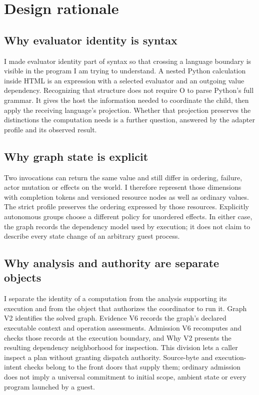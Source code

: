 \documentclass[11pt,oneside]{article}
\begin{document}
\section{Design rationale}
\label{sec:assessment}

\subsection{Why evaluator identity is syntax}

I made evaluator identity part of syntax so that crossing a language boundary
is visible in the program I am trying to understand. A nested Python
calculation inside HTML is an expression with a selected evaluator and an
outgoing value dependency. Recognizing that structure does not require O to
parse Python's full grammar. It gives the host the information needed to
coordinate the child, then apply the receiving language's projection. Whether
that projection preserves the distinctions the computation needs is a further
question, answered by the adapter profile and its observed result.

\subsection{Why graph state is explicit}

Two invocations can return the same value and still differ in ordering,
failure, actor mutation or effects on the world. I therefore represent those
dimensions with completion tokens and versioned resource nodes as well as
ordinary values. The strict profile preserves the ordering expressed by those
resources. Explicitly autonomous groups choose a different policy for
unordered effects. In either case, the graph records the dependency model
used by execution; it does not claim to describe every state change of an
arbitrary guest process.

\subsection{Why analysis and authority are separate objects}

I separate the identity of a computation from the analysis supporting its
execution and from the object that authorizes the coordinator to run it.
Graph V2 identifies the solved graph. Evidence V6 records the graph's declared
executable context and operation assessments. Admission V6 recomputes and
checks those records at the execution boundary, and Why V2 presents the
resulting dependency neighborhood for inspection. This division lets a
caller inspect a plan without granting dispatch authority. Source-byte and
execution-intent checks belong to the front doors that supply them; ordinary
admission does not imply a universal commitment to initial scope, ambient
state or every program launched by a guest.
\end{document}
